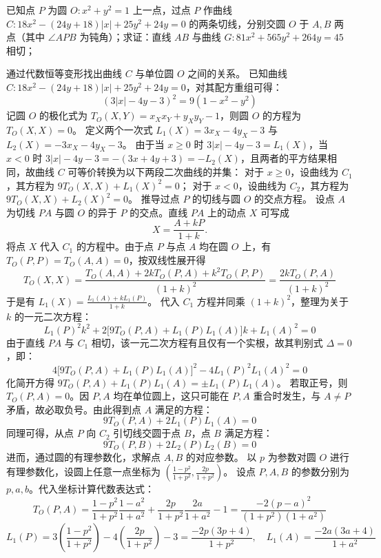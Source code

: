 \begin{example}
已知点 \(P\) 为圆 \(O: x^2 + y^2 = 1\) 上一点，过点 \(P\) 作曲线 \(C: 18x^2 - (24y + 18)|x| + 25y^2 + 24y = 0\) 的两条切线，分别交圆 \(O\) 于 \(A,B\) 两点（其中 \(\angle APB\) 为钝角）；求证：直线 \(AB\) 与曲线 \(G: 81x^2 + 565y^2 + 264y = 45\) 相切；
\end{example}
\begin{solution}
通过代数恒等变形找出曲线 $C$ 与单位圆 $O$ 之间的关系。
已知曲线 $C: 18x^2 - (24y+18)|x| + 25y^2 + 24y = 0$，对其配方重组可得：
$$ (3|x| - 4y - 3)^2 = 9(1 - x^2 - y^2) $$
记圆 $O$ 的极化式为 $T_O(X,Y) = x_X x_Y + y_X y_Y - 1$，则圆 $O$ 的方程为 $T_O(X,X) = 0$。
定义两个一次式 $L_1(X) = 3x_X - 4y_X - 3$ 与 $L_2(X) = -3x_X - 4y_X - 3$。
由于当 $x \ge 0$ 时 $3|x| - 4y - 3 = L_1(X)$，当 $x < 0$ 时 $3|x| - 4y - 3 = -(3x + 4y + 3) = -L_2(X)$，且两者的平方结果相同，故曲线 $C$ 可等价转换为以下两段二次曲线的并集：
对于 $x \ge 0$，设曲线为 $C_1$，其方程为 $9 T_O(X,X) + L_1(X)^2 = 0$；
对于 $x < 0$，设曲线为 $C_2$，其方程为 $9 T_O(X,X) + L_2(X)^2 = 0$。
推导过点 $P$ 的切线与圆 $O$ 的交点方程。
设点 $A$ 为切线 $PA$ 与圆 $O$ 的异于 $P$ 的交点。直线 $PA$ 上的动点 $X$ 可写成
\[
X = \frac{A + k P}{1+k}.
\]
将点 $X$ 代入 $C_1$ 的方程中。由于点 $P$ 与点 $A$ 均在圆 $O$ 上，有 $T_O(P,P) = T_O(A,A) = 0$，按双线性展开得
$$ T_O(X,X) = \frac{T_O(A,A) + 2k T_O(P,A) + k^2 T_O(P,P)}{(1+k)^2} = \frac{2k T_O(P,A)}{(1+k)^2} $$
于是有 $L_1(X) = \frac{L_1(A) + k L_1(P)}{1+k}$。
代入 $C_1$ 方程并同乘 $(1+k)^2$，整理为关于 $k$ 的一元二次方程：
$$ L_1(P)^2 k^2 + 2 \big[9 T_O(P,A) + L_1(P) L_1(A)\big] k + L_1(A)^2 = 0 $$
由于直线 $PA$ 与 $C_1$ 相切，该一元二次方程有且仅有一个实根，故其判别式 $\Delta = 0$，即：
$$ 4 \big[9 T_O(P,A) + L_1(P) L_1(A)\big]^2 - 4 L_1(P)^2 L_1(A)^2 = 0 $$
化简开方得 $9 T_O(P,A) + L_1(P) L_1(A) = \pm L_1(P) L_1(A)$。
若取正号，则 $T_O(P,A) = 0$。因 $P, A$ 均在单位圆上，这只可能在 $P, A$ 重合时发生，与 $A \neq P$ 矛盾，故必取负号。由此得到点 $A$ 满足的方程：
$$ 9 T_O(P,A) + 2 L_1(P) L_1(A) = 0 $$
同理可得，从点 $P$ 向 $C_2$ 引切线交圆于点 $B$，点 $B$ 满足方程：
$$ 9 T_O(P,B) + 2 L_2(P) L_2(B) = 0 $$
进而，通过圆的有理参数化，求解点 $A, B$ 的对应参数。
以 $p$ 为参数对圆 $O$ 进行有理参数化，设圆上任意一点坐标为 $\left(\frac{1-p^2}{1+p^2}, \frac{2p}{1+p^2}\right)$。
设点 $P, A, B$ 的参数分别为 $p, a, b$。代入坐标计算代数表达式：
$$ T_O(P,A) = \frac{1-p^2}{1+p^2} \frac{1-a^2}{1+a^2} + \frac{2p}{1+p^2} \frac{2a}{1+a^2} - 1 = \frac{-2(p-a)^2}{(1+p^2)(1+a^2)} $$
$$ L_1(P) = 3 \left(\frac{1-p^2}{1+p^2}\right) - 4 \left(\frac{2p}{1+p^2}\right) - 3 = \frac{-2p(3p+4)}{1+p^2}, \quad L_1(A) = \frac{-2a(3a+4)}{1+a^2} $$

\end{solution}
